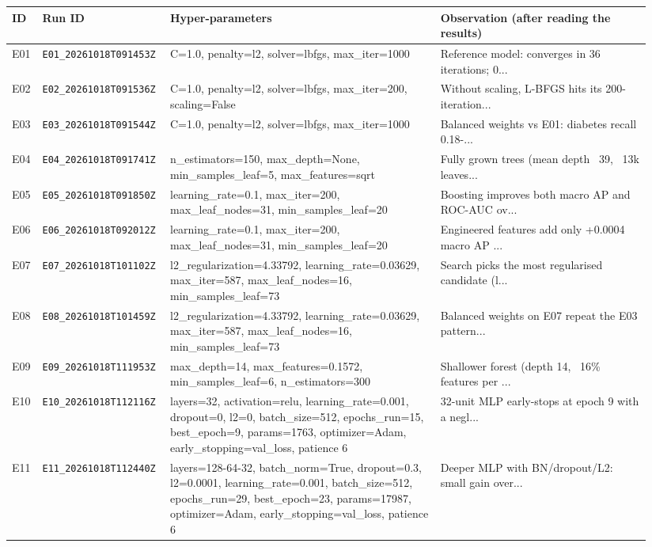 \begin{footnotesize}
\begin{longtable}{@{}p{0.04\linewidth}p{0.17\linewidth}p{0.41\linewidth}p{0.32\linewidth}@{}}
\toprule
ID & Run ID & Hyper-parameters & Observation (after reading the results)\\
\midrule
\endhead
E01 & \texttt{E01\_20261018T091453Z} & C=1.0, penalty=l2, solver=lbfgs, max\_iter=1000 & Reference model: converges in 36 iterations; 0... \\
E02 & \texttt{E02\_20261018T091536Z} & C=1.0, penalty=l2, solver=lbfgs, max\_iter=200, scaling=False & Without scaling, L-BFGS hits its 200-iteration... \\
E03 & \texttt{E03\_20261018T091544Z} & C=1.0, penalty=l2, solver=lbfgs, max\_iter=1000 & Balanced weights vs E01: diabetes recall 0.18-... \\
E04 & \texttt{E04\_20261018T091741Z} & n\_estimators=150, max\_depth=None, min\_samples\_leaf=5, max\_features=sqrt & Fully grown trees (mean depth ~39, ~13k leaves... \\
E05 & \texttt{E05\_20261018T091850Z} & learning\_rate=0.1, max\_iter=200, max\_leaf\_nodes=31, min\_samples\_leaf=20 & Boosting improves both macro AP and ROC-AUC ov... \\
E06 & \texttt{E06\_20261018T092012Z} & learning\_rate=0.1, max\_iter=200, max\_leaf\_nodes=31, min\_samples\_leaf=20 & Engineered features add only +0.0004 macro AP ... \\
E07 & \texttt{E07\_20261018T101102Z} & l2\_regularization=4.33792, learning\_rate=0.03629, max\_iter=587, max\_leaf\_nodes=16, min\_samples\_leaf=73 & Search picks the most regularised candidate (l... \\
E08 & \texttt{E08\_20261018T101459Z} & l2\_regularization=4.33792, learning\_rate=0.03629, max\_iter=587, max\_leaf\_nodes=16, min\_samples\_leaf=73 & Balanced weights on E07 repeat the E03 pattern... \\
E09 & \texttt{E09\_20261018T111953Z} & max\_depth=14, max\_features=0.1572, min\_samples\_leaf=6, n\_estimators=300 & Shallower forest (depth 14, ~16\% features per ... \\
E10 & \texttt{E10\_20261018T112116Z} & layers=32, activation=relu, learning\_rate=0.001, dropout=0, l2=0, batch\_size=512, epochs\_run=15, best\_epoch=9, params=1763, optimizer=Adam, early\_stopping=val\_loss, patience 6 & 32-unit MLP early-stops at epoch 9 with a negl... \\
E11 & \texttt{E11\_20261018T112440Z} & layers=128-64-32, batch\_norm=True, dropout=0.3, l2=0.0001, learning\_rate=0.001, batch\_size=512, epochs\_run=29, best\_epoch=23, params=17987, optimizer=Adam, early\_stopping=val\_loss, patience 6 & Deeper MLP with BN/dropout/L2: small gain over... \\

\end{longtable}
\end{footnotesize}
